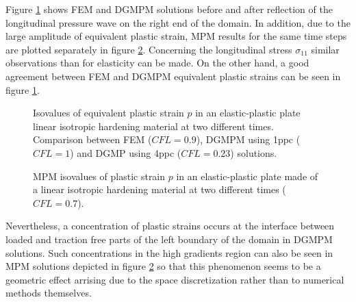 Figure \ref{fig:2dEP_comparison} shows FEM and DGMPM solutions before and after reflection of the longitudinal pressure wave on the right end of the domain.
In addition, due to the large amplitude of equivalent plastic strain, MPM results for the same time steps are plotted separately in figure \ref{fig:2dEP_mpm}. Concerning the longitudinal stress $\sigma_{11}$ similar observations than for elasticity can be made. On the other hand, a good agreement between FEM and DGMPM equivalent plastic strains can be seen in figure \ref{fig:2dEP_comparison}. 
\begin{figure}[h!]
  \centering
  
  \caption{Isovalues of equivalent plastic strain $p$ in an elastic-plastic plate linear isotropic hardening material at two different times. Comparison between FEM ($CFL=0.9$), DGMPM using 1ppc ($CFL=1$) and DGMP using 4ppc ($CFL=0.23$) solutions.}
  \label{fig:2dEP_comparison}
\end{figure}
\begin{figure}[h!]
  \centering
  
  \caption{MPM isovalues of plastic strain $p$ in an elastic-plastic plate made of a linear isotropic hardening material at two different times ($CFL=0.7$).}
  \label{fig:2dEP_mpm}
\end{figure}
Nevertheless, a concentration of plastic strains occurs at the interface between loaded and traction free parts of the left boundary of the domain in DGMPM solutions. 
Such concentrations in the high gradients region can also be seen in MPM solutions depicted in figure \ref{fig:2dEP_mpm} so that this phenomenon seems to be a geometric effect arrising due to the space discretization rather than to numerical methods themselves.
%   
%   
%   





